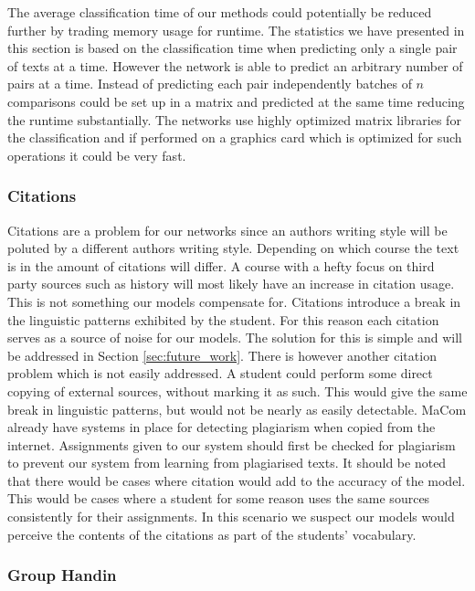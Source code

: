 The average classification time of our methods could potentially be reduced
further by trading memory usage for runtime. The statistics we have presented in
this section is based on the classification time when predicting only a single
pair of texts at a time. However the network is able to predict an arbitrary
number of pairs at a time. Instead of predicting each pair independently batches
of $n$ comparisons could be set up in a matrix and predicted at the same time
reducing the runtime substantially. The networks use highly optimized matrix
libraries for the classification and if performed on a graphics card which is
optimized for such operations it could be very fast.


\subsubsection{Citations}

Citations are a problem for our networks since an authors writing style will be
poluted by a different authors writing style. Depending on which course the text
is in the amount of citations will differ. A course with a hefty focus on third
party sources such as history will most likely have an increase in citation
usage. This is not something our models compensate for. Citations introduce a
break in the linguistic patterns exhibited by the student. For this reason each
citation serves as a source of noise for our models. The solution for this is
simple and will be addressed in Section \ref{sec:future_work}. There is however
another citation problem which is not easily addressed. A student could perform
some direct copying of external sources, without marking it as such. This would
give the same break in linguistic patterns, but would not be nearly as easily
detectable. MaCom already have systems in place for detecting plagiarism when
copied from the internet. Assignments given to our system should first be
checked for plagiarism to prevent our system from learning from plagiarised
texts. It should be noted that there would be cases where citation would add to
the accuracy of the model. This would be cases where a student for some reason
uses the same sources consistently for their assignments. In this scenario we
suspect our models would perceive the contents of the citations as part of the
students' vocabulary.


\subsubsection{Group Handin}\label{subsubsec:group_handin}

